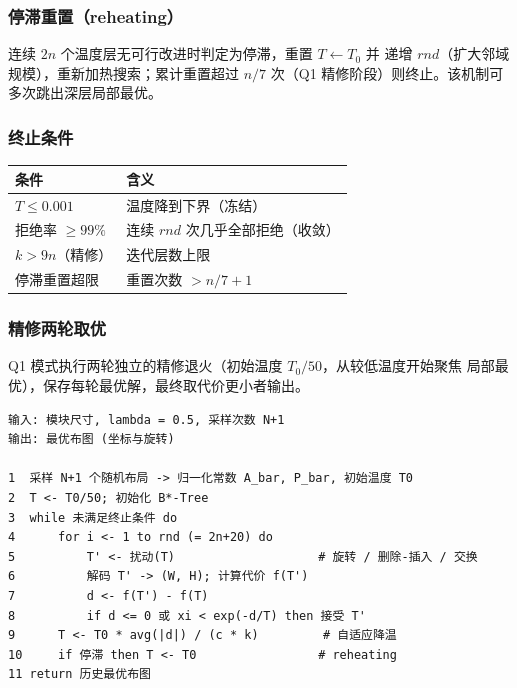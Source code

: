 \documentclass[12pt,a4paper]{article}
\begin{document}
\subsubsection{停滞重置（reheating）}

连续 $2n$ 个温度层无可行改进时判定为停滞，重置 $T \leftarrow T_0$ 并
递增 $rnd$（扩大邻域规模），重新加热搜索；累计重置超过
$n/7$ 次（Q1 精修阶段）则终止。该机制可多次跳出深层局部最优。

\subsubsection{终止条件}

\begin{table}[H]
\centering
\small
\begin{tabular}{ll}
\toprule
条件 & 含义 \\
\midrule
$T \le 0.001$ & 温度降到下界（冻结） \\
拒绝率 $\ge 99\%$ & 连续 $rnd$ 次几乎全部拒绝（收敛） \\
$k > 9n$（精修） & 迭代层数上限 \\
停滞重置超限 & 重置次数 $> n/7+1$ \\
\bottomrule
\end{tabular}
\end{table}

\subsubsection{精修两轮取优}

Q1 模式执行两轮独立的精修退火（初始温度 $T_0/50$，从较低温度开始聚焦
局部最优），保存每轮最优解，最终取代价更小者输出。

\begin{tcolorbox}[colback=blue!5, colframe=blue!60, title=算法 1：B*-Tree + 快速模拟退火]
{\small
\begin{verbatim}
输入: 模块尺寸, lambda = 0.5, 采样次数 N+1
输出: 最优布图 (坐标与旋转)

1  采样 N+1 个随机布局 -> 归一化常数 A_bar, P_bar, 初始温度 T0
2  T <- T0/50; 初始化 B*-Tree
3  while 未满足终止条件 do
4      for i <- 1 to rnd (= 2n+20) do
5          T' <- 扰动(T)                    # 旋转 / 删除-插入 / 交换
6          解码 T' -> (W, H); 计算代价 f(T')
7          d <- f(T') - f(T)
8          if d <= 0 或 xi < exp(-d/T) then 接受 T'
9      T <- T0 * avg(|d|) / (c * k)         # 自适应降温
10     if 停滞 then T <- T0                 # reheating
11 return 历史最优布图
\end{verbatim}
}
\end{tcolorbox}
\end{document}
